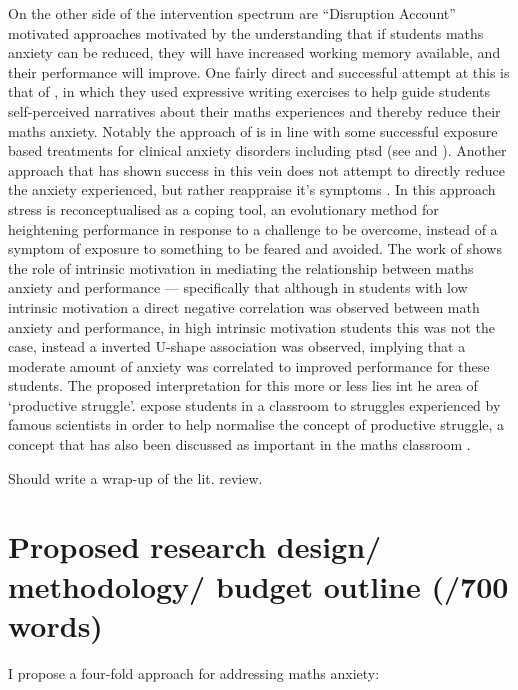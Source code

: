 \documentclass[14pt]{memoir}
\begin{document}
On the other side of the intervention spectrum are ``Disruption Account'' motivated approaches motivated by the understanding that if students maths anxiety can be reduced, they will have increased working memory available, and their performance will improve. One fairly direct and successful attempt at this is that of , in which they used expressive writing exercises to help guide students self-perceived narratives about their maths experiences and thereby reduce their maths anxiety. Notably the approach of  is in line with some successful exposure based treatments for clinical anxiety disorders including \gls{ptsd} (see  and ). Another approach that has shown success in this vein does not attempt to directly reduce the anxiety experienced, but rather reappraise it's symptoms \cite{Jamieson2016}. In this approach stress is reconceptualised as a coping tool, an evolutionary method for heightening performance in response to a challenge to be overcome, instead of a symptom of exposure to something to be feared and avoided. The work of \cite{Wang2015} shows the role of intrinsic motivation in mediating the relationship between maths anxiety and performance --- specifically that although in students with low intrinsic motivation a direct negative correlation was observed between math anxiety and performance, in high intrinsic motivation students this was not the case, instead a inverted U-shape association was observed, implying that a moderate amount of anxiety was correlated to improved performance for these students. The proposed interpretation for this more or less lies int he area of `productive struggle'.  expose students in a classroom to struggles experienced by famous scientists in order to help normalise the concept of productive struggle, a concept that has also been discussed as important in the maths classroom \cite{Hiebert2007}.
 
Should write a wrap-up of the lit. review.


\section{Proposed research design/ methodology/ budget outline (/700 words)}

I propose a four-fold approach for addressing maths anxiety:
\end{document}
